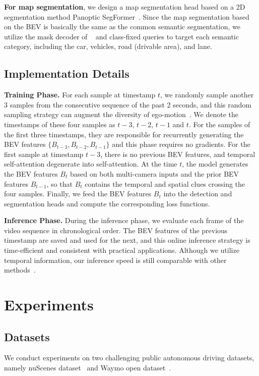 \documentclass{article}
\begin{document}
\noindent\textbf{For map segmentation}, we design a map segmentation head based on a 2D segmentation method Panoptic SegFormer~\cite{li2021panoptic}. Since the map segmentation based on the BEV is basically the same as the common semantic segmentation, we utilize the mask decoder of ~\cite{li2021panoptic} and class-fixed queries to target each semantic category, including the car, vehicles, road (drivable area), and lane.





\subsection{Implementation Details}
\noindent\textbf{Training Phase.} 
For each sample at timestamp $t$, we randomly sample another 3 samples from the consecutive sequence of the past 2 seconds, and this random sampling strategy can augment  the diversity of ego-motion~\cite{zhu2017deep}. We denote the timestamps of these four samples as $t\!-\!3$, $t\!-\!2$, $t\!-\!1$ and $t$.
For the samples of the first three timestamps, they are responsible for recurrently generating the BEV features $\{B_{t-3}, B_{t-2}, B_{t-1}\}$ and this phase requires no gradients. For the first sample at timestamp $t\!-\!3$, there is no previous BEV features, and temporal self-attention degenerate into self-attention. 
At the time $t$, the model generates the BEV features $B_t$ based on both multi-camera inputs and the prior BEV features $B_{t-1}$, so that $B_t$ contains the temporal and spatial clues crossing the four samples. Finally, we feed the BEV features $B_t$ into the detection and segmentation heads and compute the corresponding loss functions.



\noindent\textbf{Inference Phase.} During the inference phase, 
we evaluate each frame of the video sequence in chronological order.
The BEV features of the previous timestamp are saved and used for the next, and this online inference strategy is time-efficient and consistent with practical applications. Although we utilize temporal information, our inference speed is still comparable with other methods~\cite{wang2021fcos3d,wang2022detr3d}.


\section{Experiments}
\subsection{Datasets}
We conduct experiments on two challenging public autonomous driving datasets, namely nuScenes dataset~\cite{caesar2020nuscenes} and Waymo open dataset~\cite{sun2020scalability}.
\end{document}
